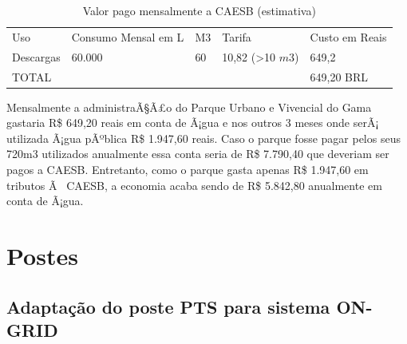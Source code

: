 \begin{table}[h]
\centering
\caption{Valor pago mensalmente a CAESB (estimativa)}
\label{Valor pago mensalmente a CAESB (estimativa)}
\begin{tabular}{lllll}
 &  &  &  &  \\ \hline
\multicolumn{1}{|l|}{Uso} & \multicolumn{1}{l|}{Consumo Mensal em L} & \multicolumn{1}{l|}{M3} & \multicolumn{1}{l|}{Tarifa} & \multicolumn{1}{l|}{Custo em Reais} \\ \hline
\multicolumn{1}{|l|}{Descargas} & \multicolumn{1}{l|}{60.000} & \multicolumn{1}{l|}{60} & \multicolumn{1}{l|}{10,82 (\textgreater10 $m{3}$)} & \multicolumn{1}{l|}{649,2} \\ \hline
\multicolumn{1}{|l|}{TOTAL} & \multicolumn{1}{l|}{} & \multicolumn{1}{l|}{} & \multicolumn{1}{l|}{} & \multicolumn{1}{l|}{649,20 BRL} \\ \hline
\end{tabular}
\end{table}

Mensalmente a administraÃ§Ã£o do Parque Urbano e Vivencial do Gama gastaria R\$ 649,20 reais em conta de Ã¡gua e nos outros 3 meses onde serÃ¡ utilizada Ã¡gua pÃºblica R\$ 1.947,60 reais. Caso o parque fosse pagar pelos seus 720m3 utilizados anualmente essa conta seria de R\$ 7.790,40 que deveriam ser pagos a CAESB. Entretanto, como o parque gasta apenas R\$ 1.947,60 em tributos Ã  CAESB, a economia acaba sendo de R\$ 5.842,80 anualmente em conta de Ã¡gua. 

\chapter{Postes}

\section{Adapta\c{c}\~ao do poste PTS para sistema ON-GRID}


